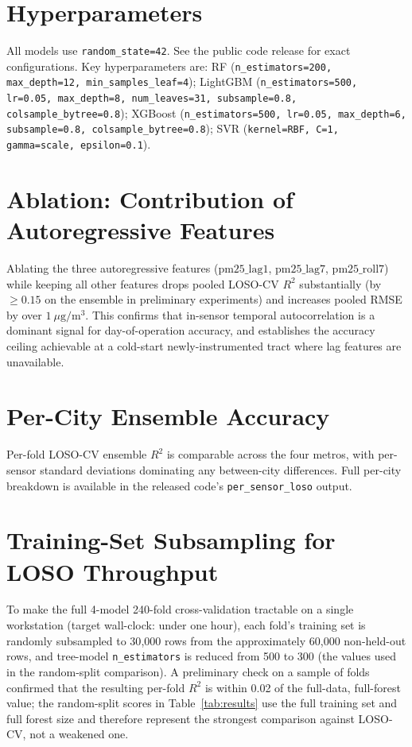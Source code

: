 \documentclass{article}
\begin{document}



\appendix

\section{Hyperparameters}
\label{sec:hparams}
All models use \texttt{random\_state=42}. See the public code release for exact configurations. Key hyperparameters are: RF (\texttt{n\_estimators=200, max\_depth=12, min\_samples\_leaf=4}); LightGBM (\texttt{n\_estimators=500, lr=0.05, max\_depth=8, num\_leaves=31, subsample=0.8, colsample\_bytree=0.8}); XGBoost (\texttt{n\_estimators=500, lr=0.05, max\_depth=6, subsample=0.8, colsample\_bytree=0.8}); SVR (\texttt{kernel=RBF, C=1, gamma=scale, epsilon=0.1}).

\section{Ablation: Contribution of Autoregressive Features}
\label{sec:ablation}
Ablating the three autoregressive features ($\mathrm{pm25\_lag1}$, $\mathrm{pm25\_lag7}$, $\mathrm{pm25\_roll7}$) while keeping all other features drops pooled LOSO-CV $R^2$ substantially (by $\geq 0.15$ on the ensemble in preliminary experiments) and increases pooled RMSE by over $1~\mu\mathrm{g}/\mathrm{m}^3$. This confirms that in-sensor temporal autocorrelation is a dominant signal for day-of-operation accuracy, and establishes the accuracy ceiling achievable at a cold-start newly-instrumented tract where lag features are unavailable.

\section{Per-City Ensemble Accuracy}
\label{sec:percity}
Per-fold LOSO-CV ensemble $R^2$ is comparable across the four metros, with per-sensor standard deviations dominating any between-city differences. Full per-city breakdown is available in the released code's \texttt{per\_sensor\_loso} output.

\section{Training-Set Subsampling for LOSO Throughput}
\label{sec:subsampling}
To make the full 4-model 240-fold cross-validation tractable on a single workstation (target wall-clock: under one hour), each fold's training set is randomly subsampled to 30{,}000 rows from the approximately 60{,}000 non-held-out rows, and tree-model \texttt{n\_estimators} is reduced from 500 to 300 (the values used in the random-split comparison). A preliminary check on a sample of folds confirmed that the resulting per-fold $R^2$ is within 0.02 of the full-data, full-forest value; the random-split scores in Table~\ref{tab:results} use the full training set and full forest size and therefore represent the strongest comparison against LOSO-CV, not a weakened one.


\end{document}
